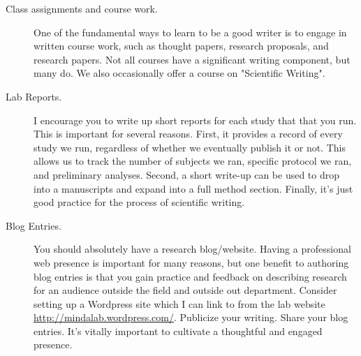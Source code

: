 \documentclass{article}
\begin{document}
\begin{description}
\item [Class assignments and course work.] One of the fundamental ways to learn to be a good writer is to engage in written course work, such as thought papers, research proposals, and research papers. Not all courses have a significant writing component, but many do. We also occasionally offer a course on "Scientific Writing".

\item [Lab Reports.] I encourage you to write up short reports for each study that that you run. This is important for several reasons. First, it provides a record of every study we run, regardless of whether we eventually publish it or not. This allows us to track the number of subjects we ran, specific protocol we ran, and preliminary analyses. Second, a short write-up can be used to drop into a manuscripts and expand into a full method section. Finally, it's just good practice for the process of scientific writing. 

\item [Blog Entries.] You should absolutely have a research blog/website. Having a professional web presence is important for many reasons, but one benefit to authoring blog entries is that you gain practice and feedback on describing research for an audience outside the field and outside out department. Consider setting up a Wordpress site which I can link to from the lab website \href{http://mindalab.wordpress.com}{http://mindalab.wordpress.com/}. Publicize your writing. Share your blog entries. It's vitally important to cultivate a thoughtful and engaged presence.

\end{description}
\end{document}
